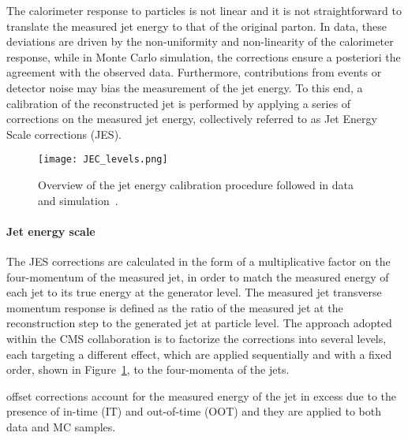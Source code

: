 The calorimeter response to particles is not linear and it is not straightforward to translate the measured jet energy
to that of the original parton.
In data, these deviations are driven by the non-uniformity and non-linearity of the calorimeter response,
while in Monte Carlo simulation, the corrections ensure a posteriori the agreement with the observed data.
Furthermore, contributions from \pileup{} events or detector noise may bias the measurement of the jet energy.
To this end, a calibration of the reconstructed jet is performed by applying a series of corrections on the measured jet energy,
collectively referred to as Jet Energy Scale corrections (JES).

\begin{figure}
\centering
\texttt{[image: JEC\_levels.png]}
\caption{Overview of the jet energy calibration procedure followed in data and simulation~\cite{CMS-JME-13-004}.}
\label{fig:JECoverview}
\end{figure}


\paragraph{Jet energy scale\\}
The JES corrections are calculated in the form of a multiplicative factor on the four-momentum of the measured jet,
in order to match the measured energy of each jet to its true energy at the generator level.
The measured jet transverse momentum response is defined as the ratio of the measured jet \pt at the reconstruction step to the generated jet at particle level.
The approach adopted within the CMS collaboration is to factorize the corrections into several levels, each targeting a different effect,
which are applied sequentially and with a fixed order, shown in Figure~\ref{fig:JECoverview}, to the four-momenta of the jets.

\Pileup{} offset corrections account for the measured energy of the jet in excess due to
the presence of in-time (IT) and out-of-time (OOT) \pileup{}
and they are applied to both data and MC samples.

